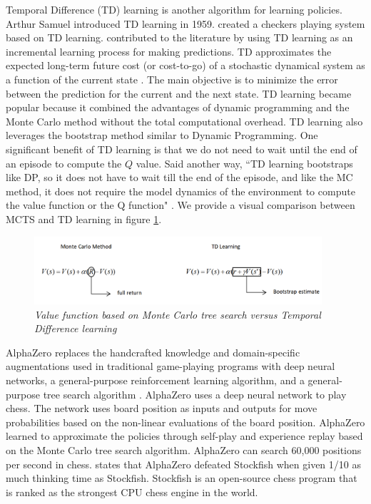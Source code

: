 \documentclass[12pt]{turabian-researchpaper}
\begin{document}
Temporal Difference (TD) learning is another algorithm for learning policies. Arthur Samuel introduced TD learning in 1959. \Textcite{samuel1959} created a checkers playing system based on TD learning. \Textcite{sutton1988learning} contributed to the literature by using TD learning as an incremental learning process for making predictions. TD approximates the expected long-term future cost (or cost-to-go) of a stochastic dynamical system as a function of the current state \parencite{baxter_learning_2000}. The main objective is to minimize the error between the prediction for the current and the next state. TD learning became popular because it combined the advantages of dynamic programming and the Monte Carlo method without the total computational overhead. TD learning also leverages the bootstrap method similar to Dynamic Programming. One significant benefit of TD learning is that we do not need to wait until the end of an episode to compute the \(Q\) value. Said another way, ``TD learning bootstraps like DP, so it does not have to wait till the end of the episode, and like the MC method, it does not require the model dynamics of the environment to compute the value function or the Q function" \parencite{science_understanding_2021}. We provide a visual comparison between MCTS and TD learning in figure \ref{fig:td_mc}. 

\begin{figure}[!ht]
    \centering
    \includegraphics[width=0.95\textwidth]{mcts_td.png}
    \caption{\textit{ Value function based on Monte Carlo tree search versus Temporal Difference learning}}
    \label{fig:td_mc}
\end{figure}

AlphaZero replaces the handcrafted knowledge and domain-specific augmentations used in traditional game-playing programs with deep neural networks, a general-purpose reinforcement learning algorithm, and a general-purpose tree search algorithm \parencite{silver_general_2018}. AlphaZero uses a deep neural network to play chess. The network uses board position as inputs and outputs for move probabilities based on the non-linear evaluations of the board position. AlphaZero learned to approximate the policies through self-play and experience replay based on the Monte Carlo tree search algorithm. AlphaZero can search 60,000 positions per second in chess. \Textcite{silver_general_2018} states that AlphaZero defeated Stockfish when given 1/10 as much thinking time as Stockfish. Stockfish is an open-source chess program that is ranked as the strongest CPU chess engine in the world. 
\end{document}
